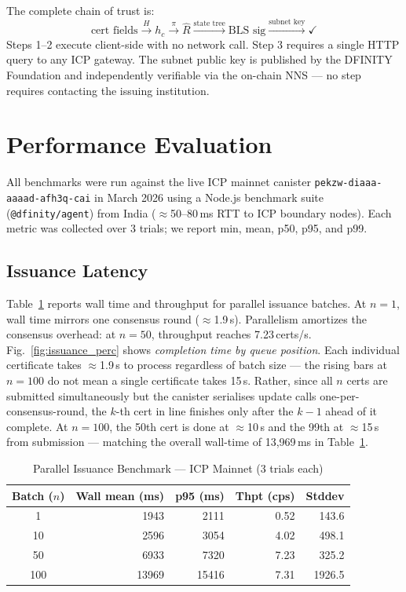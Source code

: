 \documentclass[conference,a4paper]{IEEEtran}
\begin{document}
The complete chain of trust is:
\begin{equation}
  \text{cert fields} \xrightarrow{H} h_c \xrightarrow{\;\pi\;} \hat{R} \xrightarrow{\text{state tree}} \text{BLS sig} \xrightarrow{\text{subnet key}} \checkmark
\end{equation}
Steps 1--2 execute client-side with no network call. Step 3 requires a single HTTP query to any ICP gateway. The subnet public key is published by the DFINITY Foundation and independently verifiable via the on-chain NNS — no step requires contacting the issuing institution.

\section{Performance Evaluation}
\label{sec:eval}

All benchmarks were run against the live ICP mainnet canister \texttt{pekzw-diaaa-aaaad-afh3q-cai} in March 2026 using a Node.js benchmark suite (\texttt{@dfinity/agent}) from India ($\approx$50--80\,ms RTT to ICP boundary nodes). Each metric was collected over 3 trials; we report min, mean, p50, p95, and p99.

\subsection{Issuance Latency}
Table~\ref{tab:issuance} reports wall time and throughput for parallel issuance batches. At $n{=}1$, wall time mirrors one consensus round ($\approx$1.9\,s). Parallelism amortizes the consensus overhead: at $n{=}50$, throughput reaches 7.23\,certs/s. Fig.~\ref{fig:issuance_perc} shows \textit{completion time by queue position}. Each individual certificate takes $\approx$1.9\,s to process regardless of batch size — the rising bars at $n{=}100$ do not mean a single certificate takes 15\,s. Rather, since all $n$ certs are submitted simultaneously but the canister serialises update calls one-per-consensus-round, the $k$-th cert in line finishes only after the $k{-}1$ ahead of it complete. At $n{=}100$, the 50th cert is done at $\approx$10\,s and the 99th at $\approx$15\,s from submission — matching the overall wall-time of 13{,}969\,ms in Table~\ref{tab:issuance}.

\begin{table}[t]
\caption{Parallel Issuance Benchmark --- ICP Mainnet (3 trials each)}
\label{tab:issuance}
\centering\small\renewcommand{\arraystretch}{1.1}
\begin{tabular}{@{}crrrr@{}}
\toprule
\textbf{Batch ($n$)} & \textbf{Wall mean (ms)} & \textbf{p95 (ms)} & \textbf{Thpt (cps)} & \textbf{Stddev} \\
\midrule
1   & 1943  & 2111  & 0.52 & 143.6 \\
10  & 2596  & 3054  & 4.02 & 498.1 \\
50  & 6933  & 7320  & 7.23 & 325.2 \\
100 & 13969 & 15416 & 7.31 & 1926.5 \\
\bottomrule
\end{tabular}
\end{table}
\end{document}
